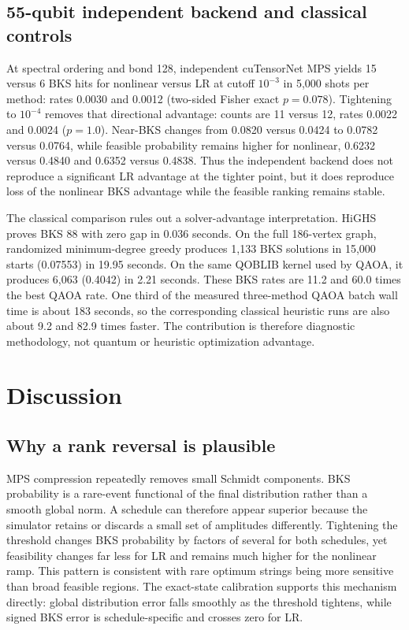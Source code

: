 \documentclass[10pt,twocolumn]{article}
\begin{document}
\subsection{55-qubit independent backend and classical controls}

At spectral ordering and bond 128, independent cuTensorNet MPS yields 15 versus
6 BKS hits for nonlinear versus LR at cutoff $10^{-3}$ in 5,000 shots per
method: rates 0.0030 and 0.0012 (two-sided Fisher exact $p=0.078$). Tightening
to $10^{-4}$ removes that directional advantage: counts are 11 versus 12,
rates 0.0022 and 0.0024 ($p=1.0$). Near-BKS changes from 0.0820 versus 0.0424
to 0.0782 versus 0.0764, while feasible probability remains higher for
nonlinear, 0.6232 versus 0.4840 and 0.6352 versus 0.4838. Thus the independent
backend does not reproduce a significant LR advantage at the tighter point,
but it does reproduce loss of the nonlinear BKS advantage while the feasible
ranking remains stable.

The classical comparison rules out a solver-advantage interpretation. HiGHS
proves BKS 88 with zero gap in 0.036 seconds. On the full 186-vertex graph,
randomized minimum-degree greedy produces 1,133 BKS solutions in 15,000 starts
(0.07553) in 19.95 seconds. On the same QOBLIB kernel used by QAOA, it produces
6,063 (0.4042) in 2.21 seconds. These BKS rates are 11.2 and 60.0 times the best
QAOA rate. One third of the measured three-method QAOA batch wall time is about
183 seconds, so the corresponding classical heuristic runs are also about 9.2
and 82.9 times faster. The contribution is therefore diagnostic methodology,
not quantum or heuristic optimization advantage.

\section{Discussion}

\subsection{Why a rank reversal is plausible}

MPS compression repeatedly removes small Schmidt components. BKS probability
is a rare-event functional of the final distribution rather than a smooth
global norm. A schedule can therefore appear superior because the simulator
retains or discards a small set of amplitudes differently. Tightening the
threshold changes BKS probability by factors of several for both schedules,
yet feasibility changes far less for LR and remains much higher for the
nonlinear ramp. This pattern is consistent with rare optimum strings being more
sensitive than broad feasible regions. The exact-state calibration supports
this mechanism directly: global distribution error falls smoothly as the
threshold tightens, while signed BKS error is schedule-specific and crosses
zero for LR.
\end{document}
